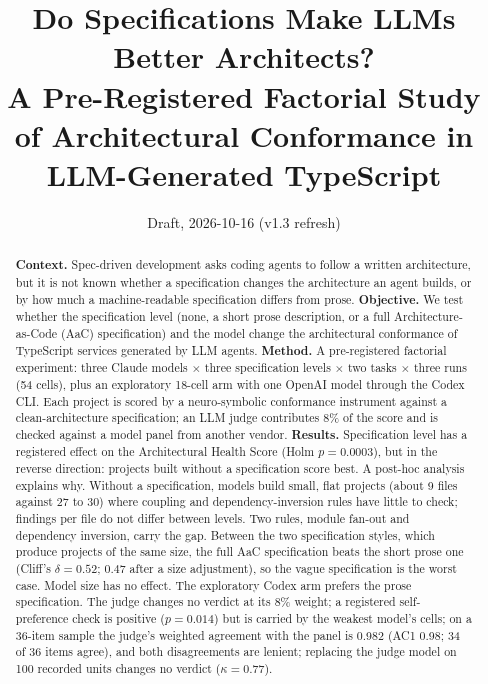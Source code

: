 \documentclass[10pt,a4paper]{article}
\title{Do Specifications Make LLMs Better Architects?\\[2pt]
\large A Pre-Registered Factorial Study of Architectural Conformance in LLM-Generated TypeScript}
\author{\todo{author list and affiliations}}
\date{Draft, 2026-10-16 (v1.3 refresh)}
\begin{document}
\maketitle

\begin{abstract}
\textbf{Context.} Spec-driven development asks coding agents to follow a written architecture, but it is not known
whether a specification changes the architecture an agent builds, or by how much a machine-readable specification
differs from prose. \textbf{Objective.} We test whether the specification level (none, a short prose description,
or a full Architecture-as-Code (AaC) specification) and the model change the architectural conformance of
TypeScript services generated by LLM agents. \textbf{Method.} A pre-registered factorial experiment: three Claude
models $\times$ three specification levels $\times$ two tasks $\times$ three runs (54 cells), plus an exploratory
18-cell arm with one OpenAI model through the Codex CLI. Each project is scored by a neuro-symbolic conformance
instrument against a clean-architecture specification; an LLM judge contributes 8\% of the score and is checked
against a model panel from another vendor. \textbf{Results.} Specification level has a registered effect on the
Architectural Health Score (Holm $p = 0.0003$), but in the reverse direction: projects built without a specification
score best. A post-hoc analysis explains why. Without a specification, models build small, flat projects (about 9
files against 27 to 30) where coupling and dependency-inversion rules have little to check; findings per file do not
differ between levels. Two rules, module fan-out and dependency inversion, carry the gap. Between the two
specification styles, which produce projects of the same size, the full AaC specification beats the short prose one
(Cliff's $\delta = 0.52$; $0.47$ after a size adjustment), so the vague specification is the worst case. Model size
has no effect. The exploratory Codex arm prefers the prose specification. The judge changes no verdict at its 8\%
weight; a registered self-preference check is positive ($p = 0.014$) but is carried by the weakest model's cells;
on a 36-item sample the judge's weighted agreement with the panel is 0.982 (AC1 0.98; 34 of 36 items agree), and both disagreements are
lenient; replacing the judge model on 100 recorded units changes no verdict ($\kappa = 0.77$).

\end{abstract}
\end{document}
